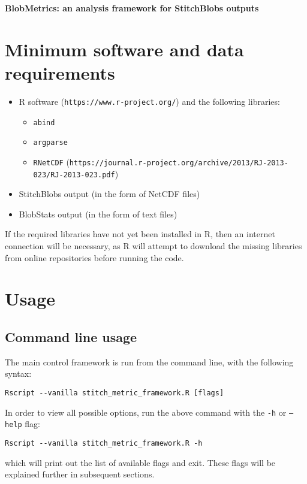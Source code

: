 \documentclass{article}
\begin{document}
{\Huge \textbf{BlobMetrics: an analysis framework for StitchBlobs outputs}}
\tableofcontents

\pagebreak

\section{Minimum software and data requirements}
\begin{itemize}
\item R software (\texttt{https://www.r-project.org/}) and the following libraries:
\begin{itemize}
\item \texttt{abind}
\item \texttt{argparse}
\item \texttt{RNetCDF} (\texttt{https://journal.r-project.org/archive/2013/RJ-2013-023/RJ-2013-023.pdf})
\end{itemize}
\item StitchBlobs output (in the form of NetCDF files)
\item BlobStats output (in the form of text files)
\end{itemize}

If the required libraries have not yet been installed in R, then an internet connection will be necessary, as R will attempt to download the missing libraries from online repositories before running the code.

\section{Usage}
\subsection{Command line usage}
The main control framework is run from the command line, with the following syntax:
\begin{verbatim}
Rscript --vanilla stitch_metric_framework.R [flags]
\end{verbatim}

In order to view all possible options, run the above command with the \texttt{-h} or \texttt{--help} flag:
\begin{verbatim}
Rscript --vanilla stitch_metric_framework.R -h
\end{verbatim}

which will print out the list of available flags and exit. These flags will be explained further in subsequent sections.
\end{document}
